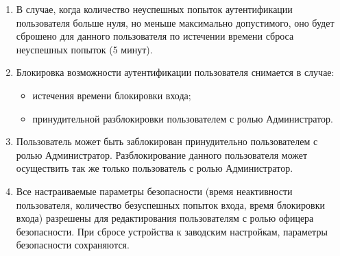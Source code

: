 \begin{enumerate}[label=\arabic{section}.\arabic{subsection}.\arabic*, labelsep=4pt, leftmargin=0pt, itemindent=57pt]
\item
В случае, когда количество неуспешных попыток аутентификации пользователя больше нуля, но меньше максимально допустимого, оно будет сброшено для данного пользователя по истечении времени сброса неуспешных попыток (5 минут).

\item
Блокировка возможности аутентификации пользователя снимается в случае:
\begin{itemize}
    \item истечения времени блокировки входа;
    \item принудительной разблокировки пользователем с ролью Администратор. 
\end{itemize}

\item
Пользователь может быть заблокирован принудительно пользователем с ролью Администратор. Разблокирование данного пользователя может осуществить так же только пользователь с ролью Администратор.

\item
Все настраиваемые параметры безопасности (время неактивности пользователя, количество безуспешных попыток входа, время блокировки входа) разрешены для редактирования пользователям с ролью офицера безопасности. При сбросе устройства к заводским настройкам, параметры безопасности сохраняются.




\end{enumerate}
